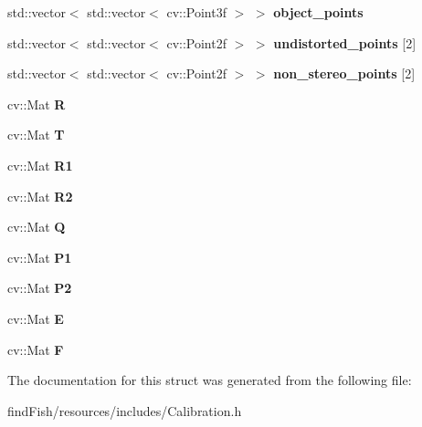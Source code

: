 \begin{DoxyCompactItemize}
std\+::vector$<$ std\+::vector$<$ cv\+::\+Point3f $>$ $>$ {\bfseries object\+\_\+points}
\item 
\mbox{\label{struct_calibration_1_1_result_ad7da770ec566a58ba31b4b80288485f0}} 
std\+::vector$<$ std\+::vector$<$ cv\+::\+Point2f $>$ $>$ {\bfseries undistorted\+\_\+points} \mbox{[}2\mbox{]}
\item 
\mbox{\label{struct_calibration_1_1_result_ae712343eff3067fa3bc09ab2c87e79f1}} 
std\+::vector$<$ std\+::vector$<$ cv\+::\+Point2f $>$ $>$ {\bfseries non\+\_\+stereo\+\_\+points} \mbox{[}2\mbox{]}
\item 
\mbox{\label{struct_calibration_1_1_result_ab422cca14ff7065ab9c546a38fefe6f8}} 
cv\+::\+Mat {\bfseries R}
\item 
\mbox{\label{struct_calibration_1_1_result_a73e388c07184b5758a9df18beef0e891}} 
cv\+::\+Mat {\bfseries T}
\item 
\mbox{\label{struct_calibration_1_1_result_adedcc5ac8785fc8b923396d6fc39e6bb}} 
cv\+::\+Mat {\bfseries R1}
\item 
\mbox{\label{struct_calibration_1_1_result_aaeed664165abc4d15b689db065271c9e}} 
cv\+::\+Mat {\bfseries R2}
\item 
\mbox{\label{struct_calibration_1_1_result_a1360a74c28880b54846a80264a071651}} 
cv\+::\+Mat {\bfseries Q}
\item 
\mbox{\label{struct_calibration_1_1_result_a9f1101486abd958165ecefe93e1a5367}} 
cv\+::\+Mat {\bfseries P1}
\item 
\mbox{\label{struct_calibration_1_1_result_af70f061c51c4fb0068f3cb70693b5ade}} 
cv\+::\+Mat {\bfseries P2}
\item 
\mbox{\label{struct_calibration_1_1_result_a81902eed27213c70509302c4757858e1}} 
cv\+::\+Mat {\bfseries E}
\item 
\mbox{\label{struct_calibration_1_1_result_a75ba6cb1951880b7068faa1038e09c41}} 
cv\+::\+Mat {\bfseries F}
\end{DoxyCompactItemize}


The documentation for this struct was generated from the following file\+:\begin{DoxyCompactItemize}
\item 
find\+Fish/resources/includes/Calibration.\+h\end{DoxyCompactItemize}
